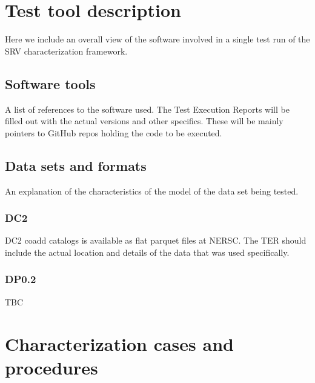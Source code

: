 \documentclass[12pt, a4paper]{article}
\begin{document}

\section{Test tool description}

Here we include an overall view of the software involved in a single test run of the SRV characterization framework.

\subsection{Software tools}

A list of references to the software used. The Test Execution Reports will be filled out with the actual versions and other specifics. These will be mainly pointers to GitHub repos holding the code to be executed.

\subsection{Data sets and formats}

An explanation of the characteristics of the model of the data set being tested.

\subsubsection{DC2}

DC2 coadd catalogs is available as flat parquet files at NERSC. The TER should include the actual location and details of the data that was used specifically.

\subsubsection{DP0.2}

TBC


\section{Characterization cases and procedures}
\end{document}
